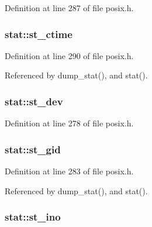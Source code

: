 Definition at line 287 of file posix.\+h.

\subsubsection[{\texorpdfstring{st\+\_\+ctime}{st_ctime}}]{ stat\+::st\+\_\+ctime}\hypertarget{structstat_a1b4b858db1ebe79c3d6e0fc1ef721024}{}\label{structstat_a1b4b858db1ebe79c3d6e0fc1ef721024}


Definition at line 290 of file posix.\+h.



Referenced by dump\+\_\+stat(), and stat().

\subsubsection[{\texorpdfstring{st\+\_\+dev}{st_dev}}]{ stat\+::st\+\_\+dev}\hypertarget{structstat_ac5b90090ae323741ae4c9e4f3683a29f}{}\label{structstat_ac5b90090ae323741ae4c9e4f3683a29f}


Definition at line 278 of file posix.\+h.

\subsubsection[{\texorpdfstring{st\+\_\+gid}{st_gid}}]{ stat\+::st\+\_\+gid}\hypertarget{structstat_ab864f16f436cec370f0ced585d897698}{}\label{structstat_ab864f16f436cec370f0ced585d897698}


Definition at line 283 of file posix.\+h.



Referenced by dump\+\_\+stat(), and stat().

\subsubsection[{\texorpdfstring{st\+\_\+ino}{st_ino}}]{ stat\+::st\+\_\+ino}\hypertarget{structstat_a9769ed8f0d4c5a9f329c32bc92479d56}{}\label{structstat_a9769ed8f0d4c5a9f329c32bc92479d56}


